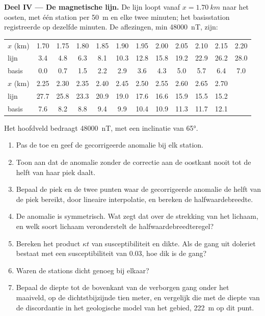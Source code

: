 \begin{problem}
\medskip\noindent\textbf{Deel IV --- De magnetische lijn.} De lijn loopt
vanaf $x = \qty{1.70}{km}$ naar het oosten, met één station per \qty{50}{m} en
elke twee minuten; het basisstation registreerde op dezelfde minuten. De
aflezingen, min \qty{48000}{nT}, zijn:
\begin{center}
\small
\setlength{\tabcolsep}{3.5pt}
\begin{tabular}{lccccccccccc}
\hline
$x$ (km) & 1.70 & 1.75 & 1.80 & 1.85 & 1.90 & 1.95 & 2.00 & 2.05 & 2.10 & 2.15 & 2.20 \\
lijn & 3.4 & 4.8 & 6.3 & 8.1 & 10.3 & 12.8 & 15.8 & 19.2 & 22.9 & 26.2 & 28.0 \\
basis & 0.0 & 0.7 & 1.5 & 2.2 & 2.9 & 3.6 & 4.3 & 5.0 & 5.7 & 6.4 & 7.0 \\
\hline
$x$ (km) & 2.25 & 2.30 & 2.35 & 2.40 & 2.45 & 2.50 & 2.55 & 2.60 & 2.65 & 2.70 & \\
lijn & 27.7 & 25.8 & 23.3 & 20.9 & 19.0 & 17.6 & 16.6 & 15.9 & 15.5 & 15.2 & \\
basis & 7.6 & 8.2 & 8.8 & 9.4 & 9.9 & 10.4 & 10.9 & 11.3 & 11.7 & 12.1 & \\
\hline
\end{tabular}
\end{center}
Het hoofdveld bedraagt \qty{48000}{nT}, met een inclinatie van \ang{65}.
\begin{enumerate}[resume]
\item Pas de  toe en geef de gecorrigeerde anomalie bij
  elk station.
\item Toon aan dat de anomalie zonder de correctie aan de oostkant nooit tot de
  helft van haar piek daalt.
\item Bepaal de piek en de twee punten waar de gecorrigeerde anomalie de
  helft van de piek bereikt, door lineaire interpolatie, en bereken de halfwaardebreedte.
\item De anomalie is symmetrisch. Wat zegt dat over de strekking van
  het lichaam, en welk soort lichaam veronderstelt de halfwaardebreedteregel?
\item Bereken het product $\kappa t$ van susceptibiliteit en dikte.
  Als de gang uit doleriet bestaat met een susceptibiliteit van \num{0.03}, hoe dik is
  de gang?
\item Waren de stations dicht genoeg bij elkaar?
\item Bepaal de diepte tot de bovenkant van de verborgen gang onder het maaiveld, op
  de dichtstbijzijnde tien meter, en vergelijk die met de diepte van de
  discordantie in het geologische model van het gebied, \qty{222}{m} op dit
  punt.
\end{enumerate}
\end{problem}
